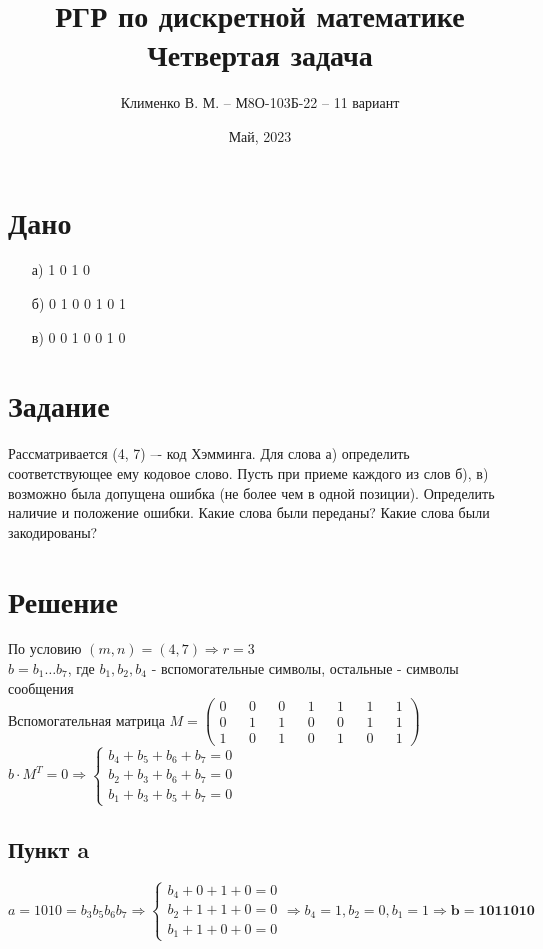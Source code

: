 \documentclass{article}
\title{РГР по дискретной математике\\Четвертая задача}
\author{Клименко В. М. -- М8О-103Б-22 -- 11 вариант}
\date{Май, 2023}
\begin{document}
\maketitle

\section*{Дано}
\begin{enumerate}
    \item[а)] 1 0 1 0
    \item[б)] 0 1 0 0 1 0 1
    \item[в)] 0 0 1 0 0 1 0
\end{enumerate}


\section*{Задание}
Рассматривается (4, 7) –- код Хэмминга. Для слова а) определить соответствующее ему
кодовое слово. Пусть при приеме каждого из слов б), в) возможно была допущена ошибка
(не более чем в одной позиции). Определить наличие и положение ошибки. Какие слова
были переданы? Какие слова были закодированы?


\section*{Решение}
По условию $(m, n) = (4, 7) \Rightarrow r = 3$
\\
$b = b_1\dots b_7$, где $b_1, b_2, b_4$ - вспомогательные символы, остальные - символы сообщения
\\
Вспомогательная матрица
$
M =
\begin{pmatrix}
    0 && 0 && 0 && 1 && 1 && 1 && 1 \\
    0 && 1 && 1 && 0 && 0 && 1 && 1 \\
    1 && 0 && 1 && 0 && 1 && 0 && 1
\end{pmatrix}
$
\\
$b \cdot M^T = 0 \Rightarrow
\begin{cases}
    b_4 + b_5 + b_6 + b_7 = 0 \\
    b_2 + b_3 + b_6 + b_7 = 0 \\
    b_1 + b_3 + b_5 + b_7 = 0
\end{cases}
$

\subsection*{Пункт a}
$a = 1010 = b_3b_5b_6b_7 \Rightarrow
\begin{cases}
    b_4 + 0 + 1 + 0 = 0 \\
    b_2 + 1 + 1 + 0 = 0 \\
    b_1 + 1 + 0 + 0 = 0
\end{cases} \Rightarrow
b_4 = 1, b_2 = 0, b_1 = 1 \Rightarrow
\mathbf{b = 1011010}
$
\end{document}
